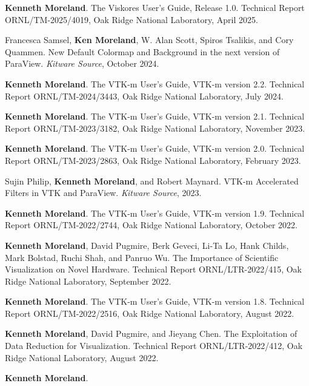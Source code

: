\begin{enumerate}[label={[\arabic*]}, left=0pt]
\item  %
  \textbf{Kenneth Moreland}.
  The Viskores User's Guide, Release 1.0.
Technical Report ORNL/TM-2025/4019, Oak Ridge National Laboratory, April 2025.
\item  %
  Francesca Samsel, \textbf{Ken Moreland}, W. Alan Scott, Spiros Tsalikis, and Cory Quammen.
  New Default Colormap and Background in the next version of {ParaView}.
\emph{Kitware Source}, October 2024.
\item  %
  \textbf{Kenneth Moreland}.
  The {VTK-m} User's Guide, {VTK-m} version 2.2.
Technical Report ORNL/TM-2024/3443, Oak Ridge National Laboratory, July 2024.
\item  %
  \textbf{Kenneth Moreland}.
  The {VTK-m} User's Guide, {VTK-m} version 2.1.
Technical Report ORNL/TM-2023/3182, Oak Ridge National Laboratory, November 2023.
\item  %
  \textbf{Kenneth Moreland}.
  The {VTK-m} User's Guide, {VTK-m} version 2.0.
Technical Report ORNL/TM-2023/2863, Oak Ridge National Laboratory, February 2023.
\item  %
  Sujin Philip, \textbf{Kenneth Moreland}, and Robert Maynard.
  {VTK-m} Accelerated Filters in {VTK} and {ParaView}.
\emph{Kitware Source}, 2023.
\item  %
  \textbf{Kenneth Moreland}.
  The {VTK-m} User's Guide, {VTK-m} version 1.9.
Technical Report ORNL/TM-2022/2744, Oak Ridge National Laboratory, October 2022.
\item  %
  \textbf{Kenneth Moreland}, David Pugmire, Berk Geveci, Li-Ta Lo, Hank Childs, Mark Bolstad, Ruchi Shah, and Panruo Wu.
  The Importance of Scientific Visualization on Novel Hardware.
Technical Report ORNL/LTR-2022/415, Oak Ridge National Laboratory, September 2022.
\item  %
  \textbf{Kenneth Moreland}.
  The {VTK-m} User's Guide, {VTK-m} version 1.8.
Technical Report ORNL/TM-2022/2516, Oak Ridge National Laboratory, August 2022.
\item  %
  \textbf{Kenneth Moreland}, David Pugmire, and Jieyang Chen.
  The Exploitation of Data Reduction for Visualization.
Technical Report ORNL/LTR-2022/412, Oak Ridge National Laboratory, August 2022.
\item  %
  \textbf{Kenneth Moreland}.

\end{enumerate}
